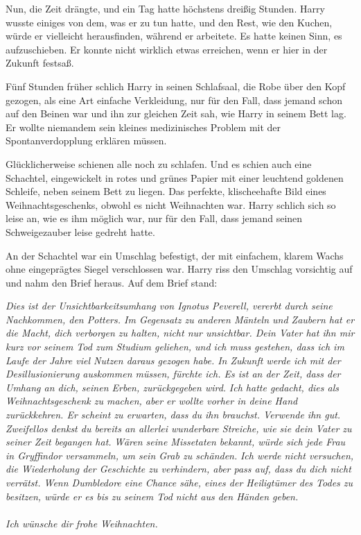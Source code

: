 Nun, die Zeit drängte, und ein Tag hatte höchstens dreißig Stunden. Harry wusste
einiges von dem, was er zu tun hatte, und den Rest, wie den Kuchen, würde er
vielleicht herausfinden, während er arbeitete. Es hatte keinen Sinn, es
aufzuschieben. Er konnte nicht wirklich etwas erreichen, wenn er hier in der
Zukunft festsaß.

Fünf Stunden früher schlich Harry in seinen Schlafsaal, die Robe über den Kopf
gezogen, als eine Art einfache Verkleidung, nur für den Fall, dass jemand schon
auf den Beinen war und ihn zur gleichen Zeit sah, wie Harry in seinem Bett lag.
Er wollte niemandem sein kleines medizinisches Problem mit der
Spontanverdopplung erklären müssen.

Glücklicherweise schienen alle noch zu schlafen. Und es schien auch eine
Schachtel, eingewickelt in rotes und grünes Papier mit einer leuchtend goldenen
Schleife, neben seinem Bett zu liegen. Das perfekte, klischeehafte Bild eines
Weihnachtsgeschenks, obwohl es nicht Weihnachten war. Harry schlich sich so
leise an, wie es ihm möglich war, nur für den Fall, dass jemand seinen
Schweigezauber leise gedreht hatte.

An der Schachtel war ein Umschlag befestigt, der mit einfachem, klarem Wachs
ohne eingeprägtes Siegel verschlossen war. Harry riss den Umschlag vorsichtig
auf und nahm den Brief heraus. Auf dem Brief stand:

\begin{center}
\emph{Dies ist der Unsichtbarkeitsumhang von Ignotus Peverell, vererbt durch
seine Nachkommen, den Potters. Im Gegensatz zu anderen Mänteln und Zaubern hat
er die Macht, dich verborgen zu halten, nicht nur unsichtbar. Dein Vater hat ihn
mir kurz vor seinem Tod zum Studium geliehen, und ich muss gestehen, dass ich im
Laufe der Jahre viel Nutzen daraus gezogen habe. In Zukunft werde ich mit der
Desillusionierung auskommen müssen, fürchte ich. Es ist an der Zeit, dass der
Umhang an dich, seinen Erben, zurückgegeben wird.} \emph{Ich hatte gedacht, dies
als Weihnachtsgeschenk zu machen, aber er wollte vorher in deine Hand
zurückkehren. Er scheint zu erwarten, dass du ihn brauchst. Verwende ihn gut.
Zweifellos denkst du bereits an allerlei wunderbare Streiche, wie sie dein Vater
zu seiner Zeit begangen hat.} \emph{Wären seine Missetaten bekannt, würde sich
jede Frau in Gryffindor versammeln, um sein Grab zu schänden.} \emph{Ich werde
nicht versuchen, die Wiederholung der Geschichte zu verhindern, aber pass auf,
dass du dich nicht verrätst. Wenn Dumbledore eine Chance sähe, eines der
Heiligtümer des Todes zu besitzen, würde er es bis zu seinem Tod nicht aus den
Händen geben.}\\~\\
\emph{Ich wünsche dir frohe Weihnachten.}
\end{center}

